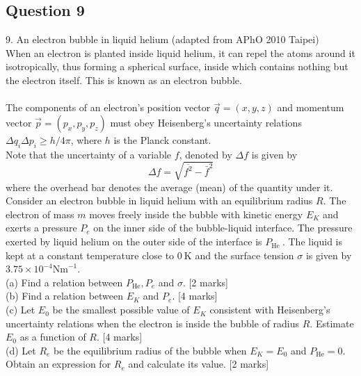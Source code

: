\documentclass{article}
\begin{document}
\subsection{Question 9}
9. An electron bubble in liquid helium (adapted from APhO 2010 Taipei) \\
When an electron is planted inside liquid helium, it can repel the atoms around it isotropically, thus forming a spherical surface, inside which contains nothing but the electron itself. This is known as an electron bubble. \\
\\
The components of an electron's position vector $\vec{q}=(x, y, z)$ and momentum vector $\vec{p}=\left(p_{x}, p_{y}, p_{z}\right)$ must obey Heisenberg's uncertainty relations $\Delta q_{i} \Delta p_{i} \geq h / 4 \pi$, where $h$ is the Planck constant. \\
Note that the uncertainty of a variable $f$, denoted by $\Delta f$ is given by
$$
\Delta f=\sqrt{\overline{f^{2}}-\bar{f}^{2}}
$$
where the overhead bar denotes the average (mean) of the quantity under it. \\
Consider an electron bubble in liquid helium with an equilibrium radius $R$. The electron of mass $m$ moves freely inside the bubble with kinetic energy $E_{K}$ and exerts a pressure $P_{e}$ on the inner side of the bubble-liquid interface. The pressure exerted by liquid helium on the outer side of the interface is $P_{\text {He }}$. The liquid is kept at a constant temperature close to $0 \mathrm{~K}$ and the surface tension $\sigma$ is given by $3.75 \times 10^{-4} \mathrm{Nm}^{-1}$.  \\
(a) Find a relation between $P_{\mathrm{He}}, P_{e}$ and $\sigma$. [2 marks] \\
(b) Find a relation between $E_{K}$ and $P_{e}$. [4 marks] \\
(c) Let $E_{0}$ be the smallest possible value of $E_{K}$ consistent with Heisenberg's uncertainty relations when the electron is inside the bubble of radius $R$. Estimate $E_{0}$ as a function of $R$. [4 marks] \\
(d) Let $R_{e}$ be the equilibrium radius of the bubble when $E_{K}=E_{0}$ and $P_{\mathrm{He}}=0 .$ Obtain an expression for $R_{e}$ and calculate its value. [2 marks]
\end{document}
